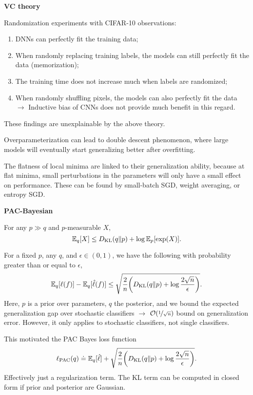 \documentclass[10pt]{article}
\newenvironment{topic}[1]
{\textbf{\sffamily \colorbox{black}{\rlap{\textbf{\textcolor{white}{#1}}}\hspace{\linewidth}\hspace{-2\fboxsep}}}}
{}
\newenvironment{subtopic}[1]
{\begin{center}\textbf{\sffamily #1}\end{center}}
{}
\begin{document}
\begin{multicols*}{3}
\begin{topic}{Statistical learning theory}
\begin{subtopic}{VC theory}
            Randomization experiments with CIFAR-10 observations:
            \begin{enumerate}
                \item DNNs can perfectly fit the training data;
                \item When randomly replacing training labels, the models can still perfectly fit the data
                      (memorization);
                \item The training time does not increase much when labels are randomized;
                \item When randomly shuffling pixels, the models can also perfectly fit the data $\to$ Inductive bias of
                      CNNs does not provide much benefit in this regard.
            \end{enumerate}
            These findings are unexplainable by the above theory.

            Overparameterization can lead to double descent phenomenon, where large models will eventually
            start generalizing better after overfitting.

            The flatness of local minima are linked to their generalization ability, because at flat minima,
            small perturbations in the parameters will only have a small effect on performance. These can be
            found by small-batch SGD, weight averaging, or entropy SGD.
        \end{subtopic}

        \begin{subtopic}{PAC-Bayesian}
            For any $p \gg q$ and $p$-measurable $X$, \[
                \mathbb{E}_q[X] \leq D_{\mathrm{KL}}(q \| p) + \log \mathbb{E}_p[\exp(X)].
            \]

            For a fixed $p$, any $q$, and $\epsilon \in (0,1)$, we have the following with probability greater
            than or equal to $\epsilon$, \[
                \E_q[\ell(f)] - \E_q[\hat{\ell}(f)] \leq \sqrt{\frac{2}{n} \lft( D_{\mathrm{KL}}(q \| p) + \log \frac{2 \sqrt{n}}{\epsilon} \rgt)}.
            \]
            Here, $p$ is a prior over parameters, $q$ the posterior, and we bound the expected generalization
            gap over stochastic classifiers $\to$ $\bigo{\nicefrac{1}{\sqrt{n}}}$ bound on generalization
            error. However, it only applies to stochastic classifiers, not single classifiers.

            This motivated the PAC Bayes loss function \[
                \ell_{\mathrm{PAC}}(q) \doteq \E_q[\hat{\ell}] + \sqrt{\frac{2}{n} \lft( D_{\mathrm{KL}}(q \| p) + \log \frac{2\sqrt{n}}{\epsilon} \rgt)}.
            \]
            Effectively just a regularization term. The KL term can be computed in closed form if prior and
            posterior are Gaussian.
        \end{subtopic}


\end{topic}
\end{multicols*}
\end{document}

